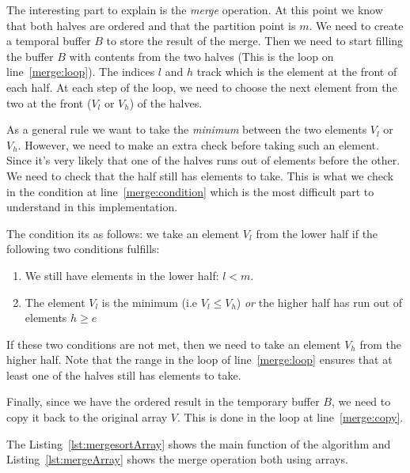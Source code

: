 The interesting part to explain is the \emph{merge} operation.
At this point we know that both halves are ordered and that the partition point is $m$.
We need to create a temporal buffer $B$ to store the result of the merge.
Then we need to start filling the buffer $B$ with contents from the two halves (This is the loop on line~\ref{merge:loop}).
The indices $l$ and $h$ track which is the element at the front of each half.
At each step of the loop, we need to choose the next element from the two at the front ($V_l$ or $V_h$) of the halves.

As a general rule we want to take the \emph{minimum} between the two elements $V_{l}$ or $V_{h}$.
However, we need to make an extra check before taking such an element.
Since it's very likely that one of the halves runs out of elements before the other.
We need to check that the half still has elements to take.
This is what we check in the condition at line~\ref{merge:condition} which is the most difficult part to understand in this implementation.

The condition its as follows: we take an element $V_l$ from the lower half if the following two conditions fulfills:
\begin{enumerate}
 \item We still have elements in the lower half: $l < m$.
 \item The element $V_{l}$ is the minimum (i.e $V_{l} \leq V_{h}$) \emph{or} the higher half has run out of elements $h \geq e$
\end{enumerate}
If these two conditions are not met, then we need to take an element $V_h$ from the higher half.
Note that the range in the loop of line~\ref{merge:loop} ensures that at least one of the halves still has elements to take.

Finally, since we have the ordered result in the temporary buffer $B$, we need to copy it back to the original array $V$.
This is done in the loop at line~\ref{merge:copy}.

The Listing~\ref{lst:mergesortArray} shows the main function of the algorithm and Listing~\ref{lst:mergeArray} shows the merge operation both using arrays.



